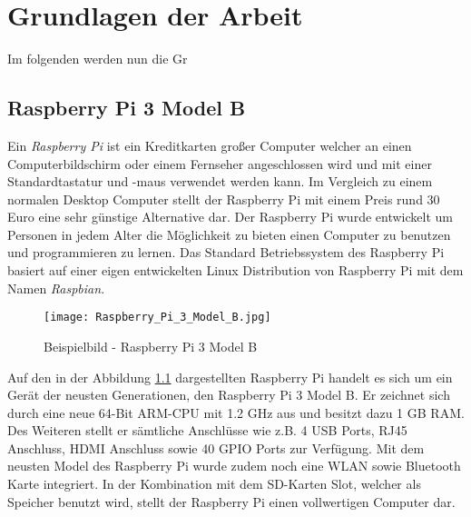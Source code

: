 
\chapter{Grundlagen der Arbeit}

Im folgenden werden nun die Gr

\section{Raspberry Pi 3 Model B}
Ein \textit{Raspberry Pi} ist ein Kreditkarten großer Computer welcher an einen Computerbildschirm oder einem Fernseher angeschlossen wird und mit einer Standardtastatur und -maus verwendet werden kann. Im Vergleich zu einem normalen Desktop Computer stellt der Raspberry Pi mit einem Preis rund 30 Euro eine sehr günstige Alternative dar. Der Raspberry Pi wurde entwickelt um Personen in jedem Alter die Möglichkeit zu bieten einen Computer zu benutzen und programmieren zu lernen. Das Standard Betriebssystem des Raspberry Pi basiert auf einer eigen entwickelten Linux Distribution von Raspberry Pi mit dem Namen \textit{Raspbian}. \autocite{what_is_a_raspberry_pi?_2019}
\begin{figure}[h]
	\centering
	\texttt{[image: Raspberry\_Pi\_3\_Model\_B.jpg]}
	\caption{Beispielbild - Raspberry Pi 3 Model B \autocite{raspberry_pi_2019}}
	\label{img:grafik-RaspberryPi3}
\end{figure}
\newline

Auf den in der Abbildung \ref{img:grafik-RaspberryPi3} dargestellten Raspberry Pi handelt es sich um ein Gerät der neusten Generationen, den Raspberry Pi 3 Model B. Er zeichnet sich durch eine neue 64-Bit \ac{ARM}-\ac{CPU} mit 1.2 \ac{GHz} aus und besitzt dazu 1 \ac{GB} \ac{RAM}. Des Weiteren stellt er sämtliche Anschlüsse wie z.B. 4 \ac{USB} Ports, RJ45 Anschluss, \ac{HDMI} Anschluss sowie 40 \ac{GPIO} Ports zur Verfügung. Mit dem neusten Model des Raspberry Pi wurde zudem noch eine \ac{WLAN} sowie Bluetooth Karte integriert. In der Kombination mit dem \ac{SD-Karten} Slot, welcher als Speicher benutzt wird, stellt der Raspberry Pi einen vollwertigen Computer dar. \autocite{kurniawan_2016}
 
